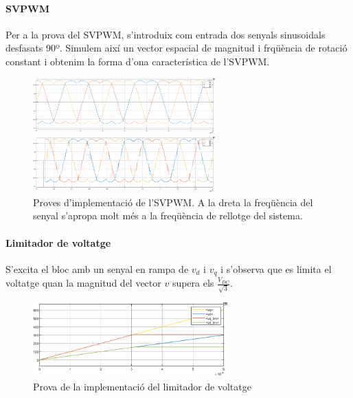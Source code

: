 {    \paragraph{SVPWM} Per a la prova del SVPWM, s'introduix com entrada dos
        senyals sinusoidals desfasats 90º. Simulem així un vector espacial de
        magnitud i frqüència de rotació constant i obtenim la forma d'ona
        característica de l'SVPWM.

        \begin{figure}[!htb]
            \begin{minipage}[c]{7.5cm}
                \centering
                \captionsetup{justification=centering}
                \includegraphics[width=7cm]
                    {img/5_resultats/sv_test.png}             
            \end{minipage} \hfil \hfil
            \begin{minipage}[c]{7.5cm}
                \centering
                \captionsetup{justification=centering}
                \includegraphics[width=7cm]
                    {img/5_resultats/sv_test2.png}           
            \end{minipage} \hfil
            \caption[Proves d'implementació de l'SVPWM]
            {  
                Proves d'implementació de l'SVPWM. A la dreta la 
                freqüència del senyal s'apropa molt més a la freqüència de
                rellotge del sistema.
            }
        \end{figure} 
        
    \paragraph{Limitador de voltatge} S'excita el bloc amb un senyal en rampa
        de $v_d$ i $v_q$ i s'observa que es limita el voltatge quan la magnitud
        del vector $v$ supera els $\frac{V_{DC}}{\sqrt{3}}$.
    
        \begin{figure}[!htb]
            \centering
            \captionsetup{justification=centering,margin=1.5cm}
            \includegraphics[width=7.5cm]
                {img/5_resultats/limitador.png}
            \caption{ Prova de la implementació del limitador de voltatge }
        \end{figure}     
    
}

